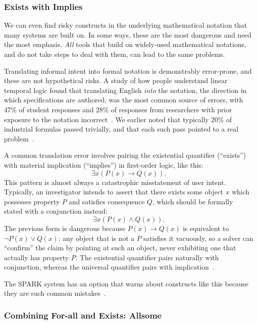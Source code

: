 \subsubsection{Exists with Implies}

We can even find risky constructs in the underlying mathematical notation that many systems are built on. In some ways, these are the most dangerous and need the most emphasis. \emph{All} tools that build on widely-used mathematical notations, and do not take steps to deal with them, can lead to the same problems.

Translating informal intent into formal notation is demonstrably error-prone, and these are not hypothetical risks. A study of how people understand linear temporal logic found that translating English \emph{into} the notation, the direction in which specifications are authored, was the most common source of errors, with 47\% of student responses and 28\% of responses from researchers with prior exposure to the notation incorrect~\cite{greenman2023ltl}. We earlier noted that typically 20\% of industrial formulas passed trivially, and that each such pass pointed to a real problem~\cite{beer2001vacuity}.

A common translation error involves pairing the existential quantifier (``exists'') with material implication (``implies'') in first-order logic, like this:
\[ \exists x (P(x) \rightarrow Q(x)). \]
This pattern is almost always a catastrophic misstatement of user intent. Typically, an investigator intends to assert that there exists some object $x$ which possesses property $P$ and satisfies consequence $Q$, which should be formally stated with a conjunction instead:
\[ \exists x (P(x) \land Q(x)). \]
The previous form is dangerous because $P(x) \rightarrow Q(x)$ is equivalent to $\neg P(x) \lor Q(x)$: any object that is not a $P$ satisfies it vacuously, so a solver can ``confirm'' the claim by pointing at such an object, never exhibiting one that actually has property $P$. The existential quantifier pairs naturally with conjunction, whereas the universal quantifier pairs with implication~\cite{barwise2011lpl}.

The SPARK system has an option that warns about constructs like this because they are such common mistakes~\cite{wheeler2026allsome}.

\subsubsection{Combining For-all and Exists: Allsome}

